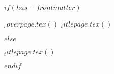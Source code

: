 $if(has-frontmatter)$
\begin{frontmatter}
\begin{titlepage}
$_coverpage.tex()$%
$_titlepage.tex()$
  
\end{titlepage}
\setcounter{page}{1}
\end{frontmatter}
$else$
\begin{titlepage}
$_titlepage.tex()$
  
\end{titlepage}
$endif$

  
